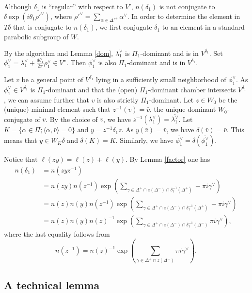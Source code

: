 \documentclass[10pt,leqno]{article}
\renewcommand{\a}{\mathfrak a}
\newcommand{\g}{\mathfrak g}
\def\a{\alpha}
\def\g{\gamma}
\def\d{\delta}
\def\D{\Delta}
\def\th{\theta}
\def\l{\lambda}
\def\i{^{-1}}
\begin{document}
Although $\d_1$ is ``regular'' with respect to $V'$, $n(\d_1)$ is not conjugate to $\d \exp(i \th_1 {\rho'}^\vee)$, where ${\rho'}^\vee=\sum_{\a \in {\D'}^+} \a^\vee$. In order to determine the element in $T \d$ that is conjugate to $n(\d_1)$, we first conjugate $\d_1$ to an element in a standard parabolic subgroup of $W$.

By the algorithm and Lemma \ref{dom}, $\l_1^\vee$ is $\Pi_1$-dominant and is in $V^{\d_1}$. Set $\phi_1^\vee = \l_1^\vee + \frac{d \th_1}{2 \pi}\rho_1^\vee \in V^x$. Then $\phi_1^\vee$ is also $\Pi_1$-dominant and is in $V^{\d_1}$.

Let $v$ be a general point of $V^{\d_1}$ lying in a sufficiently small neighborhood of $\phi_1^\vee$. As $\phi_1^\vee \in V^{\d_1}$ is $\Pi_1$-dominant and that the (open) $\Pi_1$-dominant chamber intersects $V^{\d_1}$, we can assume further that $v$ is also strictly $\Pi_1$-dominant. Let $z \in W_0$ be the (unique) minimal element such that $z\i(v) = \bar v$, the unique dominant $W_0$-conjugate of $v$. By the choice of $v$, we have $z^{-1}(\l_1^\vee)=\overline{\l_1^\vee}$. Let $K=\{\a \in \Pi; \langle\a, \bar v\rangle=0\}$ and $y = z^{-1} \d_1 z$. As $y(\bar v)=\bar v$, we have $\d(\bar v)=\bar v$. This means that $y \in W_K \d$ and $\d(K)=K$. Similarly, we have $\overline{\phi_1^\vee} = \d(\overline{\phi_1^\vee})$.

Notice that $\ell(z y)=\ell(z) + \ell(y)$. By Lemma \ref{factor} one has \begin{align*} n(\d_1) &= n(z y z^{-1}) \\ &= n(z y) n(z^{-1}) \exp(\sum_{\g \in \D^+ \cap z(\D^-) \cap \d_1 \i (\D^+)} -\pi i \g^\vee) \\ &= n(z) n(y) n(z^{-1}) \exp(\sum_{\g \in \D^+ \cap z(\D^-) \cap \d_1 \i (\D^+)} -\pi i \g^\vee) \\ &= n(z) n(y) n(z)^{-1} \exp(\sum_{\g \in \D^+ \cap z(\D^-) \cap \d_1 \i(\D^-)} \pi i \g^\vee), \end{align*} where the last equality follows from $$n(z^{-1})=n(z)^{-1} \exp(\sum_{\g \in \D^+ \cap z(\D^-)} \pi i \g^\vee).$$

\subsection{A technical lemma}
\end{document}
